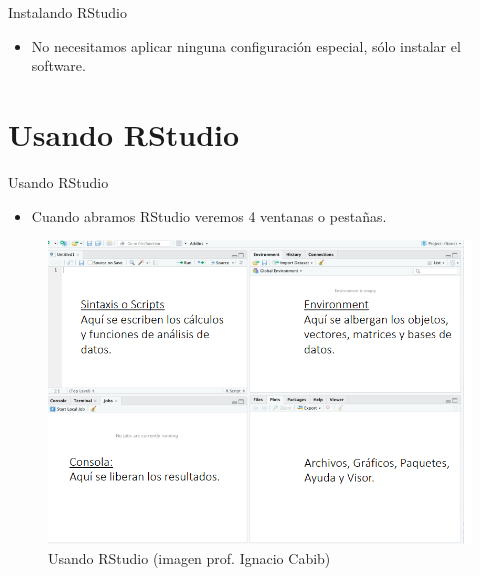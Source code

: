 \documentclass[
  13pt,
  ignorenonframetext,
]{beamer}
\providecommand{\tightlist}{%
  \setlength{\itemsep}{0pt}\setlength{\parskip}{0pt}}
\begin{document}
\begin{frame}{Instalando RStudio}
\label{instalando-rstudio}
\begin{itemize}
\tightlist
\item
  No necesitamos aplicar ninguna configuración especial, sólo instalar
  el software.
\end{itemize}
\end{frame}

\section{Usando RStudio}\label{usando-rstudio}

\begin{frame}{Usando RStudio}
\begin{itemize}
\tightlist
\item
  Cuando abramos RStudio veremos 4 ventanas o pestañas.
\end{itemize}

\begin{figure}[H]
\centering
\includegraphics[keepaspectratio,width=\textwidth, height=.7\textheight]{input/img/img1_9.png}
\caption{Usando RStudio (imagen prof. Ignacio Cabib)}\label{rstudiousando1}
\end{figure}
\end{frame}
\end{document}
